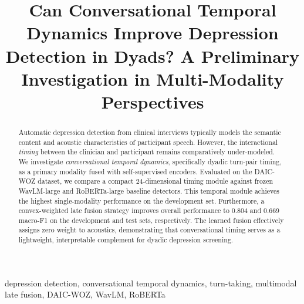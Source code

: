 \documentclass{article}
\title{Can Conversational Temporal Dynamics Improve Depression Detection in Dyads? A Preliminary Investigation in Multi-Modality Perspectives}
\begin{document}
%
\maketitle
%
\begin{abstract}
Automatic depression detection from clinical interviews typically models the semantic content and acoustic characteristics of participant speech. 
However, the interactional \emph{timing} between the clinician and participant remains comparatively under-modeled. 
We investigate \emph{conversational temporal dynamics}, specifically dyadic turn-pair timing, as a primary modality fused with self-supervised encoders. 
Evaluated on the DAIC-WOZ dataset, we compare a compact 24-dimensional timing module against frozen WavLM-large and RoBERTa-large baseline detectors. 
This temporal module achieves the highest single-modality performance on the development set. 
Furthermore, a convex-weighted late fusion strategy improves overall performance to 0.804 and 0.669 macro-F1 on the development and test sets, respectively. 
The learned fusion effectively assigns zero weight to acoustics, demonstrating that conversational timing serves as a lightweight, interpretable complement for dyadic depression screening.
\end{abstract}

\begin{keywords}
depression detection, conversational temporal dynamics, turn-taking, multimodal late fusion, DAIC-WOZ, WavLM, RoBERTa
\end{keywords}
\end{document}
